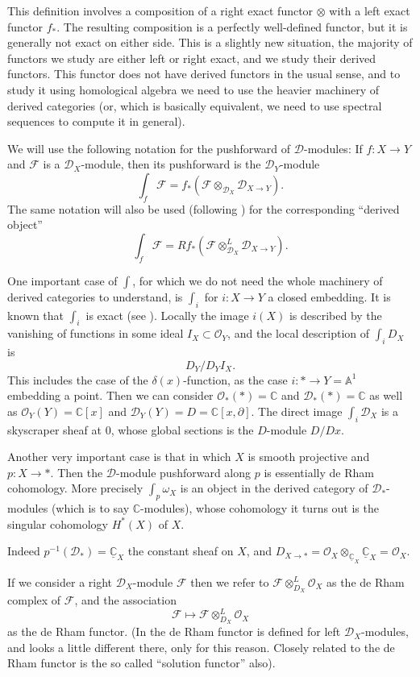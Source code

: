 \documentclass[12pt]{article}
\theoremstyle{plain}
\theoremstyle{definition}
\numberwithin{equation}{section}
\newcommand{\bbA}{\mathbb{A}}
\newcommand{\C}{\mathbb{C}}
\newcommand{\CD}{\mathcal{D}}
\newcommand{\CF}{\mathcal{F}}
\newcommand{\OO}{\mathcal{O}}
\begin{document}
This definition involves a composition of a right exact functor $\otimes$ with a left exact functor $f_*$. The resulting composition is a perfectly well-defined functor, but it is generally not exact on either side. This is a slightly new situation, the majority of functors we study are either left or right exact, and we study their derived functors. This functor does not have derived functors in the usual sense, and to study it using homological algebra we need to use the heavier machinery of derived categories (or, which is basically equivalent, we need to use spectral sequences to compute it in general).


We will use the following notation for the pushforward of $\CD$-modules: If $f : X \rightarrow Y$ and $\CF$ is a $\CD_X$-module, then its pushforward is the $\CD_Y$-module
\[
\int_f \CF = f_* (\CF \otimes_{\CD_X} \CD_{X \rightarrow Y}).
\]
The same notation will also be used (following {\cite[p. 40]{HTT}}) for the corresponding ``derived object''
\[
\int_f \CF = Rf_* (\CF \otimes^L_{\CD_X} \CD_{X \rightarrow Y}).
\]

One important case of $\int$, for which we do not need the whole machinery of derived categories to understand, is $\int_i$ for $i : X \rightarrow Y$ a closed embedding. It is known that $\int_i$ is exact (see {\cite[p. 69]{HTT}}). Locally the image $i(X)$ is described by the vanishing of functions in some ideal $I_X \subset \OO_Y$, and the local description of $\int_i D_X$ is
\[
D_Y / D_Y I_X.
\]
This includes the case of the $\delta(x)$-function, as the case $i : * \rightarrow Y = \bbA^1$ embedding a point. Then we can consider $\OO_*(*) = \C$ and $\CD_*(*) = \C$ as well as $\OO_Y(Y) = \C[x]$ and $\CD_Y(Y) = D = \C[x, \partial]$. The direct image $\int_i \CD_X$ is a skyscraper sheaf at $0$, whose global sections is the $D$-module $D / Dx$.


Another very important case is that in which $X$ is smooth projective and $p : X \rightarrow *$. Then the $\CD$-module pushforward along $p$ is essentially de Rham cohomology. More precisely $\int_p \omega_X$ is an object in the derived category of $\CD_*$-modules (which is to say $\C$-modules), whose cohomology it turns out is the singular cohomology $H^*(X)$ of $X$.

Indeed $p^{-1}(\CD_*) = \underline{\C}_X$ the constant sheaf on $X$, and $D_{X \rightarrow *} = \OO_X \otimes_{\underline{\C}_X} \underline{\C}_X = \OO_X$.

If we consider a right $\CD_X$-module $\CF$ then we refer to $\CF \otimes^L_{D_X} \OO_{X}$ as the de Rham complex of $\CF$, and the association
\[
\CF \mapsto \CF \otimes^L_{D_X} \OO_{X}
\]
as the de Rham functor. (In {\cite[Section 4.2]{HTT}} the de Rham functor is defined for left $\CD_X$-modules, and looks a little different there, only for this reason. Closely related to the de Rham functor is the so called ``solution functor'' also).
\end{document}
